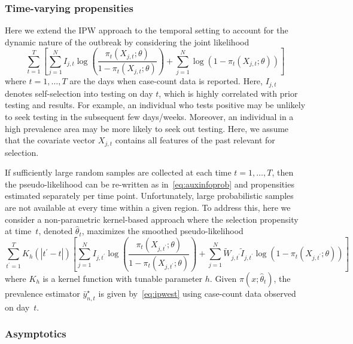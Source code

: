 \documentclass[11pt]{amsart}
\numberwithin{equation}{section}
\theoremstyle{plain}
\begin{document}
 \subsubsection{Time-varying propensities}

 Here we extend the IPW approach to the temporal setting to account for the dynamic nature of the outbreak by considering the joint likelihood
 \begin{equation}
 \label{eq:tvpropensity}
 \sum_{t=1}^T \left[ \sum_{j=1}^N I_{j,t} \log \left( \frac{\pi_t (X_{j,t}; \theta)}{1-\pi_t(X_{j,t}; \theta)} \right) + \sum_{j=1}^N \log \left( 1 - \pi_t (X_{j,t}; \theta) \right) \right]
 \end{equation}
 where $t=1,\ldots,T$ are the days when case-count data is reported.  Here, $I_{j,t}$ denotes self-selection into testing on day $t$, which is highly correlated with prior testing and results.  For example, an individual who tests positive may be unlikely to seek testing in the subsequent few days/weeks.  Moreover, an individual in a high prevalence area may be more likely to seek out testing.  Here, we assume that the covariate vector $X_{j,t}$ contains all features of the past relevant for selection.

 If sufficiently large random samples are collected at each time $t =1,\ldots,T$, then the pseudo-likelihood can be re-written as in~\eqref{eq:auxinfoprob} and propensities estimated separately per time point.  Unfortunately, large probabilistic samples are not available at every time within a given region.  To address this, here we consider a non-parametric kernel-based approach where the selection propensity at time~$t$, denoted $\hat \theta_t$, maximizes the smoothed pseudo-likelihood
 $$
 \sum_{t^\prime=1}^T K_h(|t^\prime - t|) \left[ \sum_{j=1}^N I_{j,t^\prime} \log \left( \frac{\pi_t (X_{j,t^\prime}; \theta)}{1-\pi_t(X_{j,t^\prime}; \theta)} \right) + \sum_{j=1}^N \tilde W_{j,t^\prime} \tilde I_{j,t^\prime} \log \left( 1 - \pi_t (X_{j,t^\prime}; \theta) \right) \right]
 $$
 where $K_h$ is a kernel function with tunable parameter $h$. Given $\pi (x;\hat \theta_t)$, the prevalence estimator $\bar y_{n,t}^\star$ is given by~\ref{eq:ipwest} using case-count data observed on day~$t$.

 \subsubsection{Asymptotics}
 \label{section:asymptotics}
\end{document}
